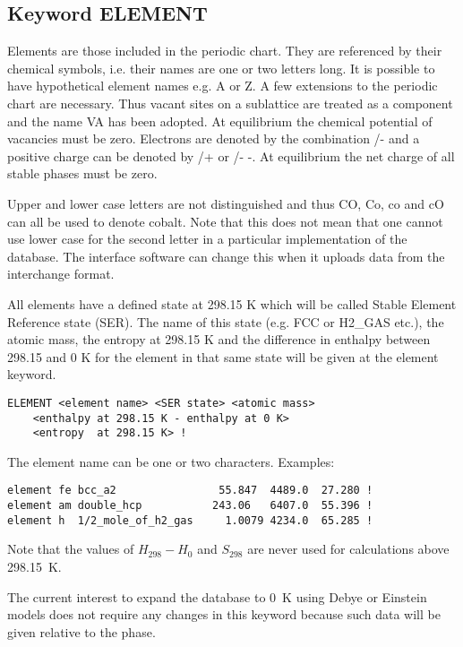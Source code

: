 \documentclass[12pt]{article}
\begin{document}
\subsection{Keyword ELEMENT}

Elements are those included in the periodic chart.  They are
referenced by their chemical symbols, i.e.  their names are one or two
letters long.  It is possible to have hypothetical element names e.g.
A or Z.  A few extensions to the periodic chart are necessary.  Thus
vacant sites on a sublattice are treated as a component and the name
VA has been adopted.  At equilibrium the chemical potential of
vacancies must be zero.  Electrons are denoted by the combination /- and
a positive charge can be denoted by /+ or /- -.  At equilibrium the net charge of
all stable phases must be zero.

Upper and lower case letters are not distinguished and thus CO, Co, co
and cO can all be used to denote cobalt.  Note that this does not mean
that one cannot use lower case for the second letter in a particular
implementation of the database.  The interface software can change
this when it uploads data from the interchange format.

All elements have a defined state at 298.15 K which will be called
Stable Element Reference state (SER).  The name of this state (e.g.  FCC
or H2\_GAS etc.), the atomic mass, the entropy at 298.15 K and the
difference in enthalpy between 298.15 and 0 K for the element in that
same state will be given at the element keyword.

\begin{verbatim}
ELEMENT <element name> <SER state> <atomic mass>
    <enthalpy at 298.15 K - enthalpy at 0 K>
    <entropy  at 298.15 K> !
\end{verbatim}

The element name can be one or two characters.  Examples:

\begin{verbatim}
element fe bcc_a2                55.847  4489.0  27.280 !
element am double_hcp           243.06   6407.0  55.396 !
element h  1/2_mole_of_h2_gas     1.0079 4234.0  65.285 !
\end{verbatim}

Note that the values of $H_{298}-H_{0}$ and $S_{298}$ are never used
for calculations above 298.15~K.

The current interest to expand the database to 0~K using Debye or
Einstein models does not require any changes in this keyword because
such data will be given relative to the phase.
\end{document}
